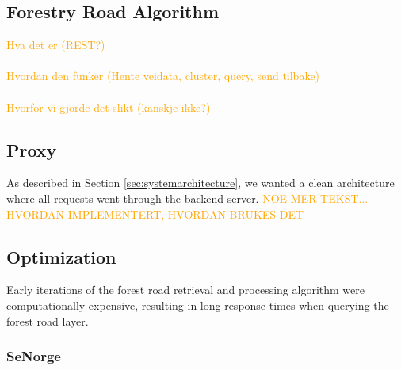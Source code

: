 \subsection{Forestry Road Algorithm}\label{subsec:server:forestroadalgorithm}

\textcolor{orange}{
Hva det er (REST?) \\ \\
Hvordan den funker (Hente veidata, cluster, query, send tilbake) \\ \\
Hvorfor vi gjorde det slikt (kanskje ikke?)
}

\subsection{Proxy}\label{subsec:server:proxy}

As described in Section \ref{sec:systemarchitecture}, we wanted a clean architecture where all requests went through the backend server. 
\textcolor{orange}{NOE MER TEKST... HVORDAN IMPLEMENTERT, HVORDAN BRUKES DET}


\subsection{Optimization}\label{subsec:server:optimization}

Early iterations of the forest road retrieval and processing algorithm were computationally expensive, resulting in long response times when querying the forest road layer.

\subsubsection{SeNorge} \label{subsubsec:implementation:optimization:senorge}


